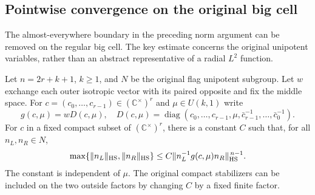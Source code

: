 \subsection{Pointwise convergence on the original big cell}
\label{archimedean-big-cell-continuity}

The almost-everywhere boundary in the preceding norm argument can be
removed on the regular big cell. The key estimate concerns the
original unipotent variables, rather than an abstract representative
of a radial $L^2$ function.

\begin{lemma}\label{block-gauss-polynomial-properness}
Let $n=2r+k+1$, $k\ge1$, and $N$ be the original flag unipotent
subgroup. Let $w$ exchange each outer isotropic vector with its
paired opposite and fix the middle space. For
$c=(c_0,\ldots,c_{r-1})\in(\mathbb C^\times)^r$ and
$\mu\in U(k,1)$ write
\[
 g(c,\mu)=wD(c,\mu),\quad
 D(c,\mu)=
 \operatorname{diag}(c_0,\ldots,c_{r-1},\mu,
                    \bar c_{r-1}^{-1},\ldots,\bar c_0^{-1}).
\]
For $c$ in a fixed compact subset of $(\mathbb C^\times)^r$,
there is a constant $C$ such that, for all $n_L,n_R\in N$,
\[
 \max\{\|n_L\|_{\rm HS},\|n_R\|_{\rm HS}\}
 \le C\|n_L^{-1}g(c,\mu)n_R\|_{\rm HS}^{\,n-1}.
\]
The constant is independent of $\mu$. The original compact
stabilizers can be included on the two outside factors by changing
$C$ by a fixed finite factor.
\end{lemma}

